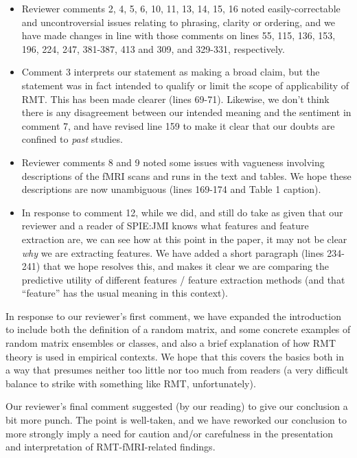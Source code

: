 \documentclass[10pt,letter]{article}
\begin{document}
\begin{itemize}
\item Reviewer comments 2, 4, 5, 6, 10, 11, 13, 14, 15, 16 noted easily-correctable
and uncontroversial issues relating to phrasing, clarity or ordering, and we
have made changes in line with those comments on lines 55, 115, 136, 153,
196, 224, 247, 381-387, 413 and 309, and 329-331, respectively.

\item Comment 3 interprets our statement as making a broad claim, but the statement
was in fact intended to qualify or limit the scope of applicability of RMT.
This has been made clearer (lines 69-71). Likewise, we don't think there is
any disagreement between our intended meaning and the sentiment in comment 7,
and have revised line 159 to make it clear that our doubts are confined to
\textit{past} studies.

\item Reviewer comments 8 and 9 noted some issues with vagueness involving
descriptions of the fMRI scans and runs in the text and tables. We hope these
descriptions are now unambiguous (lines 169-174 and Table 1 caption).

\item In response to comment 12, while we did, and still do take as given that our
reviewer and a reader of SPIE:JMI knows what features and feature extraction
are, we can see how at this point in the paper, it may not be clear
\textit{why} we are extracting features. We have added a short paragraph (lines
234-241) that we hope resolves this, and makes it clear we are comparing the
predictive utility of different features / feature extraction methods (and that
``feature'' has the usual meaning in this context).
\end{itemize}


In response to our reviewer's first comment, we have expanded the introduction
to include both the definition of a random matrix, and some concrete examples of
random matrix ensembles or classes, and also a brief explanation of how RMT
theory is used in empirical contexts. We hope that this covers the basics both
in a way that presumes neither too little nor too much from readers (a very
difficult balance to strike with something like RMT, unfortunately).


Our reviewer's final comment suggested (by our reading) to give our conclusion
a bit more punch. The point is well-taken, and we have reworked our conclusion
to more strongly imply a need for caution and/or carefulness in the
presentation and interpretation of RMT-fMRI-related findings.
\end{document}
